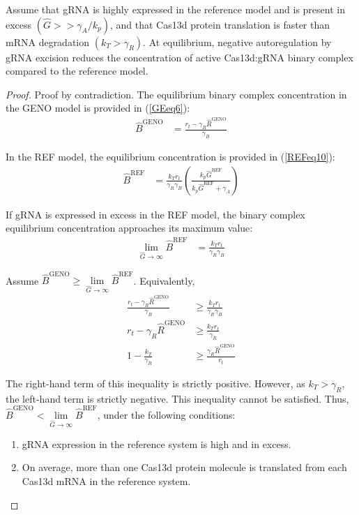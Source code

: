 \documentclass[12pt]{article}
\numberwithin{equation}{section}
\newenvironment{theorem}[2][Theorem]{\begin{trivlist}
\item[\hskip \labelsep {\bfseries #1}\hskip \labelsep {\bfseries #2.}]}{\end{trivlist}}
\begin{document}
\begin{theorem}{2}
  Assume that gRNA is highly expressed in the reference model and is present in excess $(\hat{G} >> \gamma_A/k_p)$, and that Cas13d protein translation is faster than mRNA degradation $(k_T > \gamma_R)$. At equilibrium, negative autoregulation by gRNA excision reduces the concentration of active Cas13d:gRNA binary complex compared to the reference model.
\end{theorem}

\begin{proof}
  Proof by contradiction. The equilibrium binary complex concentration in the GENO model is provided in (\ref{GEeq6}):
  \begin{align*}
    \hat{B}^{\mathrm{GENO}} &= \frac{r_t - \gamma_R \hat{R}^{\mathrm{GENO}}}{\gamma_B}
  \end{align*}

  \noindent In the REF model, the equilibrium concentration is provided in (\ref{REFeq10}):
  \begin{align*}
    \hat{B}^{\mathrm{REF}} &= \frac{k_T r_t}{\gamma_R \gamma_B} \left( \frac{k_p \hat{G}^{\mathrm{REF}}}{k_p \hat{G}^{\mathrm{REF}} + \gamma_A} \right)
  \end{align*}

  \noindent If gRNA is expressed in excess in the REF model, the binary complex equilibrium concentration approaches its maximum value:
  \begin{align*}
    \lim_{\hat{G} \to \infty} \hat{B}^{\mathrm{REF}} &= \frac{k_T r_t}{\gamma_R \gamma_B}
  \end{align*}

  \noindent Assume $\hat{B}^{\mathrm{GENO}} \geq \lim\limits_{\hat{G} \to \infty} \hat{B}^{\mathrm{REF}}$. Equivalently,
  \begin{align*}
    \frac{r_t - \gamma_R \hat{R}^{\mathrm{GENO}}}{\gamma_B} &\geq \frac{k_T r_t}{\gamma_R \gamma_B}\\
    r_t - \gamma_R \hat{R}^{\mathrm{GENO}} &\geq \frac{k_T r_t}{\gamma_R}\\
    1 - \frac{k_T}{\gamma_R} &\geq \frac{\gamma_R \hat{R}^{\mathrm{GENO}}}{r_t}
  \end{align*}

  \noindent The right-hand term of this inequality is strictly positive. However, as $k_T > \gamma_R$, the left-hand term is strictly negative. This inequality cannot be satisfied. Thus, $\hat{B}^{\mathrm{GENO}} < \lim\limits_{\hat{G} \to \infty} \hat{B}^{\mathrm{REF}}$, under the following conditions:
  \begin{enumerate}
    \item gRNA expression in the reference system is high and in excess.
    \item On average, more than one Cas13d protein molecule is translated from each Cas13d mRNA in the reference system.
  \end{enumerate}

\end{proof}
\end{document}
